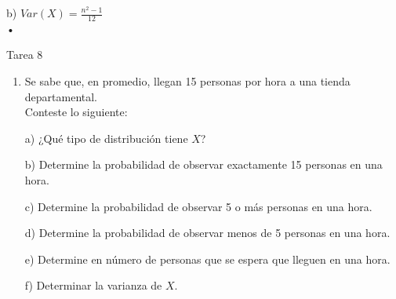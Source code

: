 \documentclass[a4paper, 12pt]{article}
\newcommand{\Aspace}{0.2cm}
\begin{document}
\begin{enumerate}
    \vspace{\Aspace} \par
    b) $Var(X) = \frac{n^{2} - 1}{12}$ 
    \\ { \color{azul} 
        •
    }
\end{enumerate}



\newpage
\begin{center}
    { \LARGE Tarea 8}
\end{center}

\begin{enumerate}
    \item Se sabe que, en promedio, llegan 15 personas por hora a una tienda departamental.
    \\ Conteste lo siguiente:
    \vspace{\Aspace} \par
    a) ¿Qué tipo de distribución tiene $X$?
    \\ { \color{azul}  }

    \vspace{\Aspace} \par
    b) Determine la probabilidad de observar exactamente 15 personas en una hora.
    \\ { \color{azul}  }

    \vspace{\Aspace} \par
    c) Determine la probabilidad de observar 5 o más personas en una hora.
    \\ { \color{azul}  }

    \vspace{\Aspace} \par
    d) Determine la probabilidad de observar menos de 5 personas en una hora.
    \\ { \color{azul}  }

    \vspace{\Aspace} \par
    e) Determine en número de personas que se espera que lleguen en una hora.
    \\ { \color{azul}  }

    \vspace{\Aspace} \par
    f) Determinar la varianza de $X$.
    \\ { \color{azul}  }




\end{enumerate}
\end{document}
